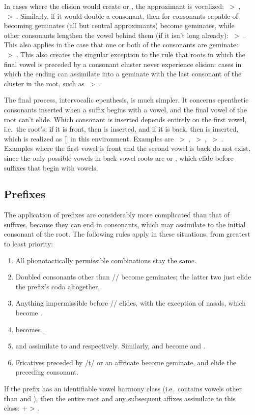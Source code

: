 In cases where the elision would create  or , the approximant
is vocalized: ~>~, ~>~. Similarly,
if it would double a consonant, then for consonants capable of becoming
geminates (all but central approximants) become geminates, while other
consonants lengthen the vowel behind them (if it isn't long already):
~>~. This also applies in the case that one or both of
the consonants are geminate: ~>~. This
also creates the singular exception to the rule that roots in which the final
vowel is preceded by a consonant cluster never experience elision: cases in
which the ending can assimilate into a geminate with the last consonant of the
cluster in the root, such as ~>~.

The final process, intervocalic epenthesis, is much simpler. It concerns
epenthetic consonants inserted when a suffix begins with a vowel, and the final
vowel of the root can't elide. Which consonant is inserted depends entirely on
the first vowel, i.e.~the root's: if it is front, then  is inserted, and
if it is back, then  is inserted, which is realized as [] in this
environment. Examples are ~>~,
~>~, ~>~. Examples where the
first vowel is front and the second vowel is back do not exist, since the only
possible vowels in back vowel roots are  or , which elide before
suffixes that begin with vowels.

\subsection{Prefixes}\label{s:assimilation}
The application of prefixes are considerably more complicated than that of
suffixes, because they can end in consonants, which may assimilate to the
initial consonant of the root. The following rules apply in these situations,
from greatest to least priority:
\begin{enumerate}
  \item All phonotactically permissible combinations stay the same.
  \item Doubled consonants other than // become geminates; the latter
    two just elide the prefix's coda altogether.
  \item Anything impermissible before // elides, with the exception of
    nasals, which become .
  \item {} becomes .
  \item {} and  assimilate to  and  respectively.
    Similarly,  and  become  and .
  \item Fricatives preceded by /t/ or an affricate become geminate, and elide
    the preceding consonant.
\end{enumerate}
If the prefix has an identifiable vowel harmony class (i.e.~contains vowels
other than  and ), then the entire root and any subsequent affixes
assimilate to this class:  +  > .

